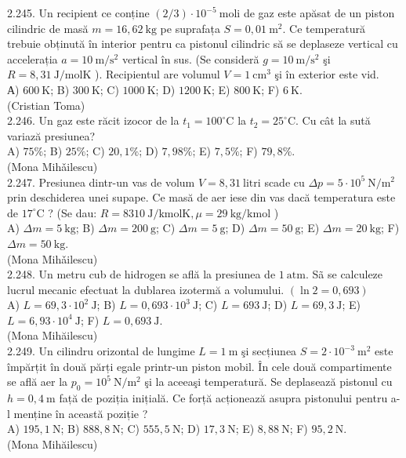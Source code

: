 2.245. Un recipient ce conține $(2 / 3) \cdot 10^{-5} \mathrm{~moli}$ de gaz este apăsat de un piston cilindric de masă $m=16,62 \mathrm{~kg}$ pe suprafața $S=0,01 \mathrm{~m}^{2}$. Ce temperatură trebuie obținută în interior pentru ca pistonul cilindric să se deplaseze vertical cu accelerația $a=10 \mathrm{~m} / \mathrm{s}^{2}$ vertical în sus. (Se consideră $g=10 \mathrm{~m} / \mathrm{s}^{2}$ şi $R=8,31 \mathrm{~J} / \mathrm{molK}$ ). Recipientul are volumul $V=1 \mathrm{~cm}^{3}$ şi în exterior este vid.\\ А) $600 \mathrm{~K}$; B) $300 \mathrm{~K}$; C) $1000 \mathrm{~K}$; D) $1200 \mathrm{~K}$; E) $800 \mathrm{~K}$; F) $6 \mathrm{~K}$.\\ (Cristian Toma)\\

2.246. Un gaz este răcit izocor de la $t_{1}=100^{\circ} \mathrm{C}$ la $t_{2}=25^{\circ} \mathrm{C}$. Cu cât la sută variază presiunea?\\ A) $75 \%$; B) $25 \%$; C) $20,1 \%$; D) $7,98 \%$; E) $7,5 \%$; F) $79,8 \%$.\\ (Mona Mihǎilescu)\\

2.247. Presiunea dintr-un vas de volum $V=8,31 \mathrm{~litri}$ scade cu $\Delta p=5 \cdot 10^{5} \mathrm{~N} / \mathrm{m}^{2}$ prin deschiderea unei supape. Ce masă de aer iese din vas dacă temperatura este de $17^{\circ} \mathrm{C}$ ? (Se dau: $R=8310 \mathrm{~J} / \mathrm{kmolK}, \mu=29 \mathrm{~kg} / \mathrm{kmol}$ )\\ A) $\Delta m=5 \mathrm{~kg}$; B) $\Delta m=200 \mathrm{~g}$; C) $\Delta m=5 \mathrm{~g}$; D) $\Delta m=50 \mathrm{~g}$; E) $\Delta m=20 \mathrm{~kg}$; F) $\Delta m=50 \mathrm{~kg}$.\\ (Mona Mihǎilescu)\\

2.248. Un metru cub de hidrogen se află la presiunea de $1 \mathrm{~atm}$. Sã se calculeze lucrul mecanic efectuat la dublarea izotermă a volumului. $(\ln 2=0,693)$\\ A) $L=69,3 \cdot 10^{2} \mathrm{~J}$; B) $L=0,693 \cdot 10^{3} \mathrm{~J}$; C) $L=693 \mathrm{~J}$; D) $L=69,3 \mathrm{~J}$; E) $L=6,93 \cdot 10^{4} \mathrm{~J}$; F) $L=0,693 \mathrm{~J}$.\\ (Mona Mihăilescu)\\

2.249. Un cilindru orizontal de lungime $L=1 \mathrm{~m}$ şi secțiunea $S=2 \cdot 10^{-3} \mathrm{~m}^{2}$ este împărțit în două părți egale printr-un piston mobil. În cele două compartimente se află aer la $p_{0}=10^{5} \mathrm{~N} / \mathrm{m}^{2}$ şi la aceeaşi temperatură. Se deplasează pistonul cu $h=0,4 \mathrm{~m}$ față de poziția inițială. Ce forță acționează asupra pistonului pentru a-l menține în această poziție ?\\ A) $195,1 \mathrm{~N}$; B) $888,8 \mathrm{~N}$; C) $555,5 \mathrm{~N}$; D) $17,3 \mathrm{~N}$; E) $8,88 \mathrm{~N}$; F) $95,2 \mathrm{~N}$.\\ (Mona Mihăilescu)\\

